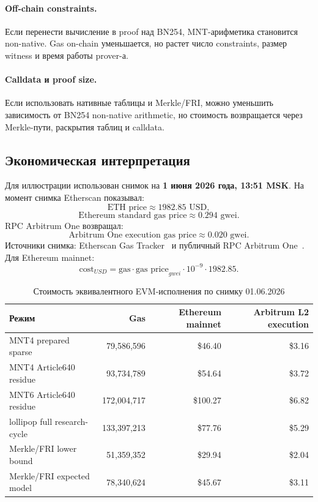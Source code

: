 \documentclass[12pt,a4paper]{article}
\newcommand{\Gas}{\mathrm{gas}}
\begin{document}
\paragraph{Off-chain constraints.}
Если перенести вычисление в proof над BN254, MNT-арифметика становится
non-native. Gas on-chain уменьшается, но растет число constraints, размер
witness и время работы prover-а.

\paragraph{Calldata и proof size.}
Если использовать нативные таблицы и Merkle/FRI, можно уменьшить зависимость от
BN254 non-native arithmetic, но стоимость возвращается через Merkle-пути,
раскрытия таблиц и calldata.

\subsection{Экономическая интерпретация}

Для иллюстрации использован снимок на
\textbf{1 июня 2026 года, 13:51 MSK}. На момент снимка Etherscan
показывал:
\[
    \text{ETH price}\approx1982.85\text{ USD},
\]
\[
    \text{Ethereum standard gas price}\approx0.294\text{ gwei}.
\]
RPC Arbitrum One возвращал:
\[
    \text{Arbitrum One execution gas price}\approx0.020\text{ gwei}.
\]
Источники снимка: Etherscan Gas Tracker~\cite{etherscanGas} и публичный RPC
Arbitrum One~\cite{arbitrumRpc}. Для Ethereum mainnet:
\[
    \text{cost}_{USD}=
    \Gas\cdot \text{gas price}_{gwei}\cdot10^{-9}\cdot1982.85.
\]

\begin{table}[htbp]
\centering
\caption{Стоимость эквивалентного EVM-исполнения по снимку 01.06.2026}
\small
\begin{tabularx}{\linewidth}{Y r r r}
\toprule
Режим & Gas & Ethereum mainnet & Arbitrum L2 execution \\
\midrule
MNT4 prepared sparse & 79,586,596 & \$46.40 & \$3.16 \\
MNT4 Article640 residue & 93,734,789 & \$54.64 & \$3.72 \\
MNT6 Article640 residue & 172,004,717 & \$100.27 & \$6.82 \\
lollipop full research-cycle & 133,397,213 & \$77.76 & \$5.29 \\
Merkle/FRI lower bound & 51,359,352 & \$29.94 & \$2.04 \\
Merkle/FRI expected model & 78,340,624 & \$45.67 & \$3.11 \\
\bottomrule
\end{tabularx}
\end{table}
\end{document}
